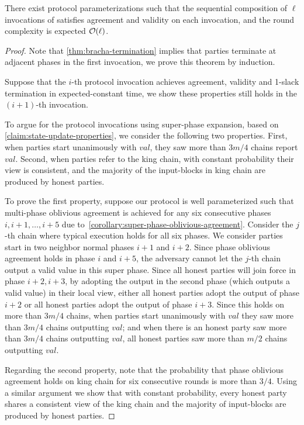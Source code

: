 \begin{theorem} \label{thm:chain-king-consensus-sequential-composition}
    There exist protocol parameterizations such that the sequential composition of $\ell$ invocations of \chainKingConsensus satisfies agreement and validity on each invocation, and the round complexity is expected $\mathcal{O}(\ell)$.
\end{theorem}

\begin{proof}
    Note that \cref{thm:bracha-termination} implies that parties terminate at adjacent phases in the first invocation, we prove this theorem by induction.

    Suppose that the $i$-th protocol invocation achieves agreement, validity and 1-slack termination in expected-constant time, we show these properties still holds in the $(i + 1)$-th invocation.

    To argue for the protocol invocations using super-phase expansion, based on \cref{claim:state-update-properties}, we consider the following two properties.
    First, when parties start unanimously with $val$, they saw more than $3m / 4$ chains report $val$.
    Second, when parties refer to the king chain, with constant probability their view is consistent, and the majority of the input-blocks in king chain are produced by honest parties.

    To prove the first property, suppose our protocol is well parameterized such that multi-phase oblivious agreement is achieved for any six consecutive phases $i, i + 1, \ldots, i + 5$ due to~\cref{corollary:super-phase-oblivious-agreement}.
    Consider the $j$-th chain where typical execution holds for all six phases.
    We consider parties start in two neighbor normal phases $i + 1$ and $i + 2$.
    Since phase oblivious agreement holds in phase $i$ and $i + 5$, the adversary cannot let the $j$-th chain output a valid value in this super phase.
    Since all honest parties will join force in phase $i + 2, i + 3$, by adopting the output in the second phase (which outputs a valid value) in their local view, either all honest parties adopt the output of phase $i + 2$ or all honest parties adopt the output of phase $i + 3$.
    Since this holds on more than $3m/ 4$ chains, when parties start unanimously with $val$ they saw more than $3m/ 4$ chains outputting $val$; and when there is an honest party saw more than $3m/ 4$ chains outputting $val$, all honest parties saw more than $m / 2$ chains outputting $val$.

    Regarding the second property, note that the probability that phase oblivious agreement holds on king chain for six consecutive rounds is more than $3 / 4$.
    Using a similar argument we show that with constant probability, every honest party shares a consistent view of the king chain and the majority of input-blocks are produced by honest parties.
\end{proof}
